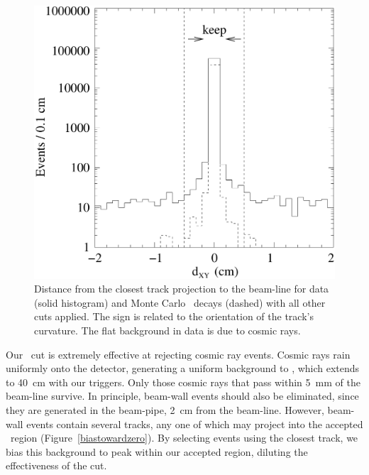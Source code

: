 \documentclass{cornell}
\begin{document}
\begin{figure}[p]
  \begin{center}
    \includegraphics[width=\linewidth]{plots/dxy}
  \end{center}
  \caption{\label{dxy} Distance from the closest track projection to
  the beam-line for data (solid histogram) and Monte Carlo \ups\ decays
  (dashed) with all other cuts applied.  The sign is related to the
  orientation of the track's curvature.  The flat background in data
  is due to cosmic rays.}
\end{figure}

Our \dxy\ cut is extremely effective at rejecting cosmic ray events.
Cosmic rays rain uniformly onto the detector, generating a uniform
background to \dxy, which extends to 40~cm with our triggers.  Only
those cosmic rays that pass within 5~mm of the beam-line survive.  In
principle, beam-wall events should also be eliminated, since they are
generated in the beam-pipe, 2~cm from the beam-line.  However, beam-wall
events contain several tracks, any one of which may project into the
accepted \dxy\ region (Figure~\ref{biastowardzero}).  By selecting
events using the closest track, we bias this background to peak within
our accepted region, diluting the effectiveness of the cut.
\end{document}
